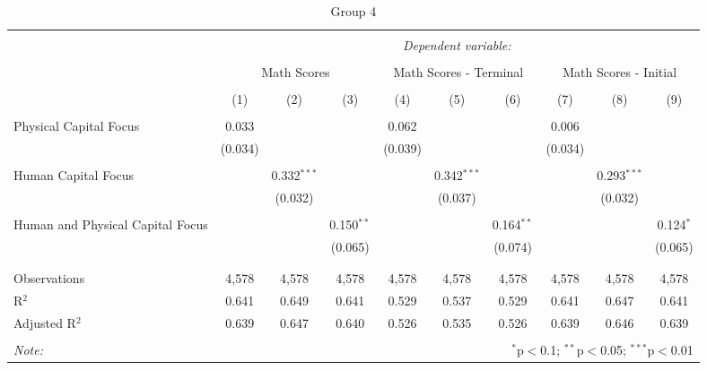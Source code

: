 
\begin{table}[!htbp] \centering 
  \caption{Group 4} 
  \label{} 
\begin{tabular}{@{\extracolsep{5pt}}lccccccccc} 
\\[-1.8ex]\hline 
\hline \\[-1.8ex] 
 & \multicolumn{9}{c}{\textit{Dependent variable:}} \\ 
\cline{2-10} 
\\[-1.8ex] & \multicolumn{3}{c}{Math Scores} & \multicolumn{3}{c}{Math Scores - Terminal} & \multicolumn{3}{c}{Math Scores - Initial} \\ 
\\[-1.8ex] & (1) & (2) & (3) & (4) & (5) & (6) & (7) & (8) & (9)\\ 
\hline \\[-1.8ex] 
 Physical Capital Focus & 0.033 &  &  & 0.062 &  &  & 0.006 &  &  \\ 
  & (0.034) &  &  & (0.039) &  &  & (0.034) &  &  \\ 
  & & & & & & & & & \\ 
 Human Capital Focus &  & 0.332$^{***}$ &  &  & 0.342$^{***}$ &  &  & 0.293$^{***}$ &  \\ 
  &  & (0.032) &  &  & (0.037) &  &  & (0.032) &  \\ 
  & & & & & & & & & \\ 
 Human and Physical Capital Focus &  &  & 0.150$^{**}$ &  &  & 0.164$^{**}$ &  &  & 0.124$^{*}$ \\ 
  &  &  & (0.065) &  &  & (0.074) &  &  & (0.065) \\ 
  & & & & & & & & & \\ 
\hline \\[-1.8ex] 
Observations & 4,578 & 4,578 & 4,578 & 4,578 & 4,578 & 4,578 & 4,578 & 4,578 & 4,578 \\ 
R$^{2}$ & 0.641 & 0.649 & 0.641 & 0.529 & 0.537 & 0.529 & 0.641 & 0.647 & 0.641 \\ 
Adjusted R$^{2}$ & 0.639 & 0.647 & 0.640 & 0.526 & 0.535 & 0.526 & 0.639 & 0.646 & 0.639 \\ 
\hline 
\hline \\[-1.8ex] 
\textit{Note:}  & \multicolumn{9}{r}{$^{*}$p$<$0.1; $^{**}$p$<$0.05; $^{***}$p$<$0.01} \\ 
\end{tabular} 
\end{table} 
